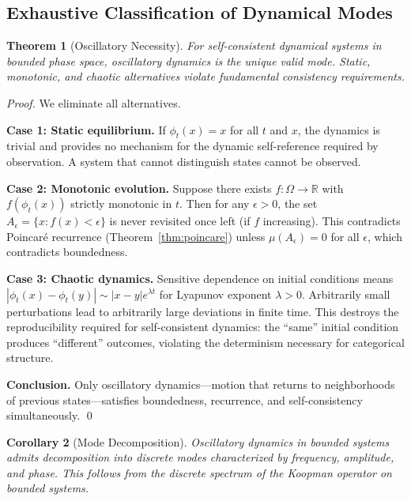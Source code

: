 \documentclass[twocolumn,10pt,a4paper]{article}
\newtheorem{theorem}{Theorem}[section]
\newtheorem{corollary}[theorem]{Corollary}
\theoremstyle{definition}
\theoremstyle{remark}
\newcommand{\Real}{\mathbb{R}}
\begin{document}
\subsection{Exhaustive Classification of Dynamical Modes}

\begin{theorem}[Oscillatory Necessity]
\label{thm:oscillatory}
For self-consistent dynamical systems in bounded phase space, oscillatory dynamics is the unique valid mode. Static, monotonic, and chaotic alternatives violate fundamental consistency requirements.
\end{theorem}

\begin{proof}
We eliminate all alternatives.

\textbf{Case 1: Static equilibrium.} If $\phi_t(x) = x$ for all $t$ and $x$, the dynamics is trivial and provides no mechanism for the dynamic self-reference required by observation. A system that cannot distinguish states cannot be observed.

\textbf{Case 2: Monotonic evolution.} Suppose there exists $f: \Omega \to \Real$ with $f(\phi_t(x))$ strictly monotonic in $t$. Then for any $\epsilon > 0$, the set $A_\epsilon = \{x : f(x) < \epsilon\}$ is never revisited once left (if $f$ increasing). This contradicts Poincar\'{e} recurrence (Theorem~\ref{thm:poincare}) unless $\mu(A_\epsilon) = 0$ for all $\epsilon$, which contradicts boundedness.

\textbf{Case 3: Chaotic dynamics.} Sensitive dependence on initial conditions means $|\phi_t(x) - \phi_t(y)| \sim |x - y| e^{\lambda t}$ for Lyapunov exponent $\lambda > 0$. Arbitrarily small perturbations lead to arbitrarily large deviations in finite time. This destroys the reproducibility required for self-consistent dynamics: the ``same'' initial condition produces ``different'' outcomes, violating the determinism necessary for categorical structure.

\textbf{Conclusion.} Only oscillatory dynamics---motion that returns to neighborhoods of previous states---satisfies boundedness, recurrence, and self-consistency simultaneously. \qed
\end{proof}

\begin{corollary}[Mode Decomposition]
\label{cor:modes}
Oscillatory dynamics in bounded systems admits decomposition into discrete modes characterized by frequency, amplitude, and phase. This follows from the discrete spectrum of the Koopman operator \citep{koopman1931} on bounded systems.
\end{corollary}
\end{document}

